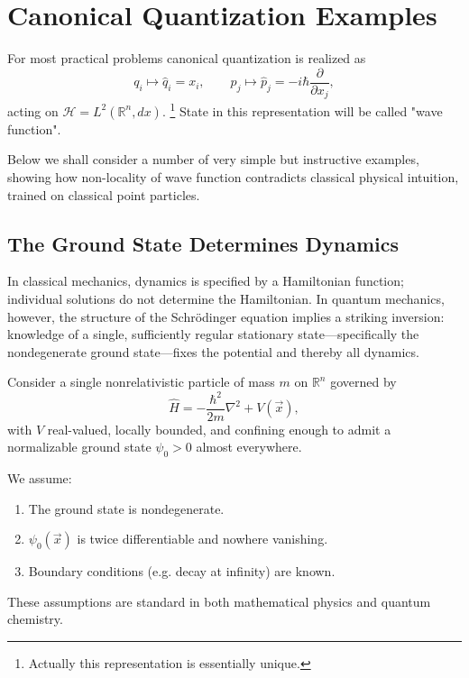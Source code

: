 \chapter{Canonical Quantization Examples}
\label{cqe}

For most practical problems canonical quantization is realized as
\begin{equation}
q_i \mapsto \hat q_i = x_i, \qquad p_j \mapsto \hat p_j = -i\hbar \frac{\partial}{\partial x_j},
\end{equation}
acting on $\mathcal{H}=L^2(\mathbb{R}^n,dx)$. \footnote{ Actually this representation
is essentially unique.}
State in this representation will be called "wave function".

Below we shall consider a number of very simple but instructive 
examples, showing how non-locality of wave function contradicts classical
physical intuition, trained on classical point particles.

\section{The Ground State Determines  Dynamics }
\label{cqe:gsdd}

In classical mechanics, dynamics is specified by a Hamiltonian function;
individual solutions do not determine the Hamiltonian. In quantum
mechanics, however, the structure of the Schr\"odinger equation implies
a striking inversion: knowledge of a single, sufficiently regular
stationary state---specifically the nondegenerate ground state---fixes
the potential and thereby all dynamics.

Consider a single nonrelativistic particle of mass $m$ on $\mathbb{R}^n$ governed by
\begin{equation}
\hat H = -\frac{\hbar^2}{2m}\nabla^2 + V(\vec x),
\end{equation}
with $V$ real-valued, locally bounded, and confining enough to admit a 
normalizable ground state $\psi_0>0$ almost everywhere.

We assume:
\begin{enumerate}
\item The ground state is nondegenerate.
\item $\psi_0(\vec{x})$ is twice differentiable and nowhere vanishing.
\item Boundary conditions (e.g. decay at infinity) are known.
\end{enumerate}
These assumptions are standard in both mathematical physics and quantum chemistry.

